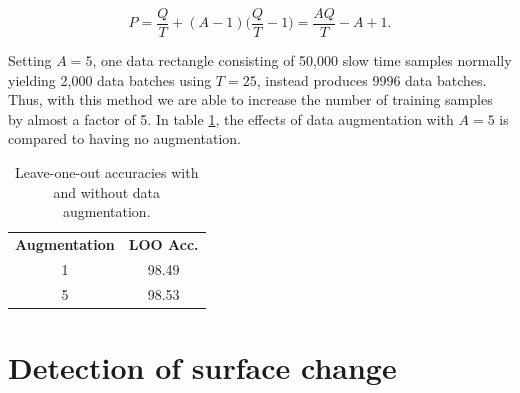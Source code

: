 \begin{equation}
	P = 
	\frac{Q}{T} + (A-1)\Big(\frac{Q}{T} - 1\Big) = 
	\frac{AQ}{T}-A+1.
\end{equation}


Setting $A=5$, one data rectangle consisting of 50,000 slow time samples normally yielding 2,000 data batches using $T=25$, instead produces 9996 data batches. Thus, with this method we are able to increase the number of training samples by almost a factor of 5. In table \ref{tab:aug}, the effects of data augmentation with $A=5$ is compared to having no augmentation.


\begin{table}
	\label{tab:aug}
	\begin{center}
		\begin{tabular}{|c|c|}
			\hline
			\rowcolor{gray!150}
			\color{white}\textbf{Augmentation} & \color{white}\textbf{LOO Acc.} \\
			1 & 98.49 \\
			5 & 98.53 \\
			\hline
		\end{tabular}
	\end{center}
	\caption{Leave-one-out accuracies with and without data augmentation.}
\end{table}



\section{Detection of surface change}

